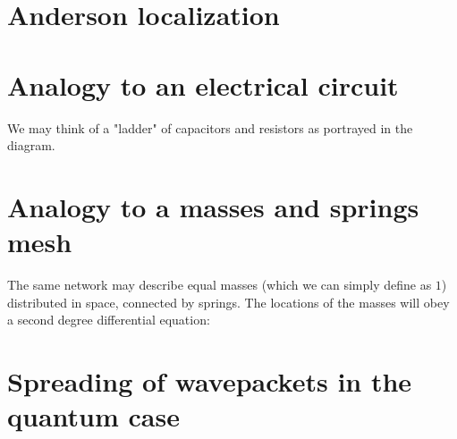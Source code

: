 \section{Anderson localization}


\section{Analogy to an electrical circuit}

We may think of a "ladder" of capacitors and resistors as portrayed in the diagram.



\section{Analogy to a masses and springs mesh} 

The same network may describe equal masses (which 
we can simply define as $1$) distributed in space,
connected by springs. The locations of the masses will
obey a second degree differential equation:


\section{Spreading of wavepackets in the quantum case}





